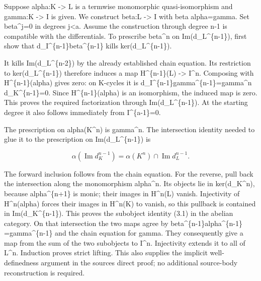\documentclass[11pt]{article}
\begin{document}
Suppose alpha:\allowbreak{}K \allowbreak{}-> L is a termwise monomorphic quasi-isomorphism and gamma:\allowbreak{}K \allowbreak{}-> I is given. We construct beta:\allowbreak{}L \allowbreak{}-> I with beta alpha\allowbreak{}=gamma. Set beta\textasciicircum{}j\allowbreak{}=0 in degrees j\textless a. Assume the construction through degree n-1 is compatible with the differentials. To prescribe beta\^{}n on Im(d\_\allowbreak{}L\textasciicircum{}\{n-1\})\allowbreak{},\allowbreak{} first show that d\_\allowbreak{}I\textasciicircum{}\{n-1\}beta\textasciicircum{}\{n-1\} kills ker(d\_\allowbreak{}L\textasciicircum{}\{n-1\})\allowbreak{}.

It kills Im(d\_\allowbreak{}L\textasciicircum{}\{n-2\})\allowbreak{} by the already established chain equation. Its restriction to ker(d\_\allowbreak{}L\textasciicircum{}\{n-1\})\allowbreak{} therefore induces a map H\textasciicircum{}\{n-1\}(L)\allowbreak{} \allowbreak{}-> I\^{}n. Composing with H\textasciicircum{}\{n-1\}(alpha)\allowbreak{} gives zero:\allowbreak{} on K-cycles it is d\_\allowbreak{}I\textasciicircum{}\{n-1\}gamma\textasciicircum{}\{n-1\}\allowbreak{}=gamma\textasciicircum{}n d\_\allowbreak{}K\textasciicircum{}\{n-1\}\allowbreak{}=0. Since H\textasciicircum{}\{n-1\}(alpha)\allowbreak{} is an isomorphism,\allowbreak{} the induced map is zero. This proves the required factorization through Im(d\_\allowbreak{}L\textasciicircum{}\{n-1\})\allowbreak{}. At the starting degree it also follows immediately from I\textasciicircum{}\{a-1\}\allowbreak{}=0.

The prescription on alpha(K\textasciicircum{}n)\allowbreak{} is gamma\^{}n. The intersection identity needed to glue it to the prescription on Im(d\_\allowbreak{}L\textasciicircum{}\{n-1\})\allowbreak{} is

\[
 \alpha(\operatorname{Im}d_K^{n-1})
       =\alpha(K^n)\cap\operatorname{Im}d_L^{n-1}.         \tag{3.1}
\]

The forward inclusion follows from the chain equation. For the reverse,\allowbreak{} pull back the intersection along the monomorphism alpha\^{}n. Its objects lie in ker(d\_\allowbreak{}K\textasciicircum{}n)\allowbreak{},\allowbreak{} because alpha\textasciicircum{}\{n\allowbreak{}+1\} is monic; their images in H\textasciicircum{}n(L)\allowbreak{} vanish. Injectivity of H\textasciicircum{}n(alpha)\allowbreak{} forces their images in H\textasciicircum{}n(K)\allowbreak{} to vanish,\allowbreak{} so this pullback is contained in Im(d\_\allowbreak{}K\textasciicircum{}\{n-1\})\allowbreak{}. This proves the subobject identity (3.1)\allowbreak{} in the abelian category. On that intersection the two maps agree by beta\^{}\{n-1\}alpha\^{}\{n-1\} \allowbreak{}=gamma\textasciicircum{}\{n-1\} and the chain equation for gamma. They consequently give a map from the sum of the two subobjects to I\^{}n. Injectivity extends it to all of L\^{}n. Induction proves strict lifting. This also supplies the implicit well-definedness argument in the source\textquotesingle s direct proof; no additional source-body reconstruction is required.
\end{document}
